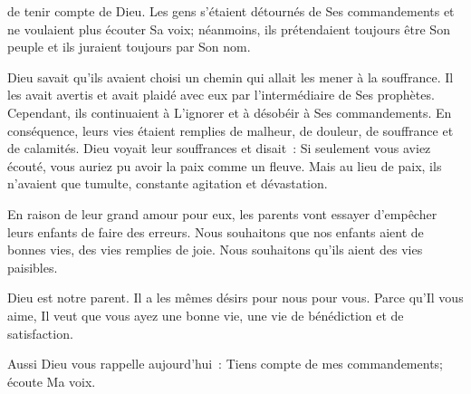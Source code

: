 
 de tenir compte de Dieu.
 Les gens s'étaient détournés de Ses commandements
 et ne voulaient plus écouter Sa voix; néanmoins, 
 ils prétendaient toujours être Son peuple
 et ils juraient toujours par Son nom. 

Dieu savait qu'ils avaient choisi un chemin
 qui allait les mener à la souffrance.
 Il les avait avertis et avait plaidé avec eux
 par l'intermédiaire de Ses prophètes.
 Cependant, ils continuaient à L'ignorer et à désobéir
 à Ses commandements. En conséquence,
 leurs vies étaient remplies de malheur, de douleur,
 de souffrance et de calamités.
 Dieu voyait leur souffrances et disait~: 
 \og Si seulement vous aviez écouté, vous auriez pu avoir la paix
 comme un fleuve. \fg{} 
 Mais au lieu de paix, ils n'avaient que tumulte,
 constante agitation et dévastation. 


En raison de leur grand amour pour eux,
 les parents vont essayer d'empêcher leurs enfants de faire des erreurs.
 Nous souhaitons que nos enfants aient de bonnes vies,
 des vies remplies de joie.
 Nous souhaitons qu'ils 
 aient des vies paisibles. 

Dieu est notre parent. Il a les mêmes désirs pour nous \ocadr pour vous.
 Parce qu'Il vous aime, Il veut que vous ayez une bonne vie,
 une vie de bénédiction et de satisfaction. 

Aussi Dieu vous rappelle aujourd'hui~: 
 \og Tiens compte de mes commandements; écoute Ma voix. \fg{}

\dvrule








